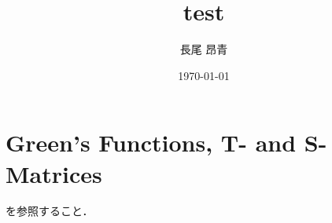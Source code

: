 \documentclass[a4paper,11pt]{ltjsarticle}
\begin{document}
\title{test}
\author{長尾 昂青}
\date{\today}
\maketitle

\tableofcontents

\newpage
\section{Green's Functions, T- and S-Matrices}
\cite{canto2013scattering}を参照すること．
\newpage
% 
% 
\printbibliography%
\end{document}
